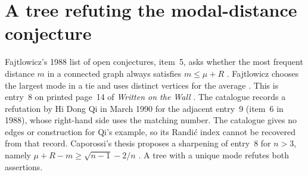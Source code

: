 \documentclass[11pt,a4paper]{article}
\begin{document}
\section{A tree refuting the modal-distance conjecture}\label{sec:mode-example}
Fajtlowicz's 1988 list of open conjectures, item~5, asks whether the most
frequent distance $m$ in a connected graph always satisfies $m\le\mu+R$
\cite[p.~115]{mode-faj}. Fajtlowicz chooses the largest mode in a tie and
uses distinct vertices for the average \cite[pp.~114--115]{mode-faj}.
This is entry~8 on printed page~14 of
\emph{Written on the Wall} \cite{cat-wow}. The catalogue records a refutation
by Hi Dong Qi in March 1990 for the adjacent entry~9 (item~6 in 1988),
whose right-hand side uses the matching number. The catalogue gives no
edges or construction for Qi's example, so its Randi\'c index cannot
be recovered from that record. Caporossi's thesis proposes a sharpening of entry~8
for $n>3$, namely $\mu+R-m\ge\sqrt{n-1}-2/n$
\cite[p.~33, Conjecture~5, equations~(1.14)--(1.15)]{cat-thesis}.
A tree with a unique mode refutes both assertions.
\end{document}
